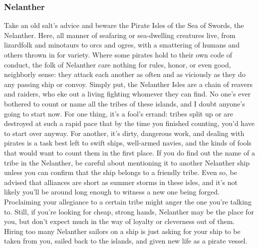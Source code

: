 \documentclass[10pt,a4paper,twoside,twocolumn,openany,bg=print,nodeprecatedcode]{dndbook}
\begin{document}
\subsubsection{Nelanther}
Take an old salt's advice and beware the Pirate Isles of the Sea of Swords, the Nelanther. Here, all manner of seafaring or sea-dwelling creatures live, from lizardfolk and minotaurs to orcs and ogres, with a smattering of humans and others thrown in for variety. Where some pirates hold to their own code of conduct, the folk of Nelanther care nothing for rules, honor, or even good, neighborly sense: they attack each another as often and as viciously as they do any passing ship or convoy. Simply put, the Nelanther Isles are a chain of reavers and raiders, who eke out a living fighting whomever they can find.
No one's ever bothered to count or name all the tribes of these islands, and I doubt anyone's going to start now. For one thing, it's a fool's errand: tribes split up or are destroyed at such a rapid pace that by the time you finished counting, you'd have to start over anyway. For another, it's dirty, dangerous work, and dealing with pirates is a task best left to swift ships, well-armed navies, and the kinds of fools that would want to count them in the first place.
If you do find out the name of a tribe in the Nelanther, be careful about mentioning it to another Nelanther ship unless you can confirm that the ship belongs to a friendly tribe. Even so, be advised that alliances are short as summer storms in these isles, and it's not likely you'll be around long enough to witness a new one being forged. Proclaiming your allegiance to a certain tribe might anger the one you're talking to.
Still, if you're looking for cheap, strong hands, Nelanther may be the place for you, but don't expect much in the way of loyalty or cleverness out of them. Hiring too many Nelanther sailors on a ship is just asking for your ship to be taken from you, sailed back to the islands, and given new life as a pirate vessel.
\end{document}
